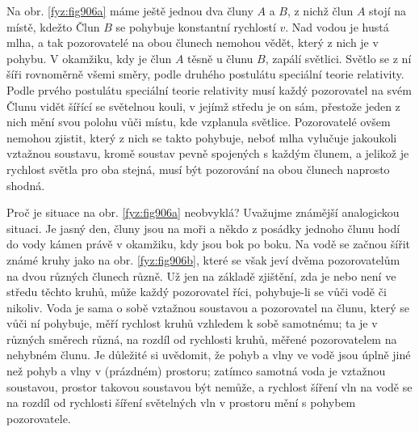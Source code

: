 \begin{mdframed}[style=mdexam]
  \begin{example}\label{fyz:fey_exam017}
    Na obr. \ref{fyz:fig906a} máme ještě jednou dva čluny \(A\) a \(B\), z nichž člun \(A\) stojí na
    místě, kdežto Člun \(B\) se pohybuje konstantní rychlostí \(v\). Nad vodou je hustá mlha, a tak
    pozorovatelé na obou člunech nemohou vědět, který z nich je v pohybu. V okamžiku, kdy je člun
    \(A\) těsně u člunu \(B\), zapálí světlici. Světlo se z ní šíři rovnoměrně všemi směry, podle
    druhého postulátu speciální teorie rela­tivity. Podle prvého postulátu speciální teorie
    relativity musí každý pozorovatel na svém Člunu vidět šířící se světelnou kouli, v jejímž středu
    je on sám, přestože jeden z nich mění svou polohu vůči místu, kde vzplanula světlice.
    Pozorovatelé ovšem nemohou zjistit, který z nich se takto pohybuje, neboť mlha vylučuje
    jakoukoli vztažnou soustavu, kromě soustav pevně spojených s každým člunem, a jelikož je
    rychlost světla pro oba stejná, musí být pozorování na obou člunech naprosto shodná.

    {\centering
    \captionsetup{type=figure}
    \par}
    \vspace{1em}

    Proč je situace na obr. \ref{fyz:fig906a} neobvyklá? Uvažujme známější analogickou situaci. Je
    jasný den, čluny jsou na moři a někdo z posádky jednoho člunu hodí do vody kámen právě v
    okamžiku, kdy jsou bok po boku. Na vodě se začnou šířit známé kruhy jako na obr.
    \ref{fyz:fig906b}, které se však jeví dvěma pozorovatelům na dvou různých člunech různě. Už jen
    na základě zjištění, zda je nebo není ve středu těchto kruhů, může každý pozorovatel říci,
    pohybuje-li se vůči vodě či nikoliv. Voda je sama o sobě vztažnou soustavou a pozorovatel na
    člunu, který se vůči ní pohybuje, měří rychlost kruhů vzhledem k sobě samotnému; ta je v různých
    směrech různá, na rozdíl od rychlosti kruhů, měřené pozorovatelem na nehybném člunu. Je důležité
    si uvědomit, že pohyb a vlny ve vodě jsou úplně jiné než pohyb a vlny v (prázdném) prostoru;
    zatímco samotná voda je vztažnou soustavou, prostor takovou soustavou být nemůže, a rychlost
    šíření vln na vodě se na rozdíl od rychlosti šíření světelných vln v prostoru mění s pohybem
    pozorovatele.

    {\centering
    \captionsetup{type=figure}
    \par}
    \vspace{1em}

  \end{example}
\end{mdframed}